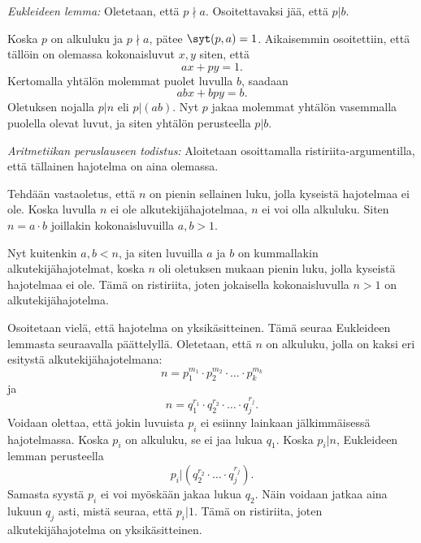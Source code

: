 \begin{todistus}
{\it Eukleideen lemma:} Oletetaan, että $p\nmid a$. Osoitettavaksi jää, että $p|b$.

Koska $p$ on alkuluku ja $p \nmid a$, pätee $\syt(p,a)=1$. Aikaisemmin osoitettiin, että tällöin on olemassa kokonaisluvut $x,y$ siten, että
\[
ax+py = 1.
\]
Kertomalla yhtälön molemmat puolet luvulla $b$, saadaan
\[
abx+bpy = b.
\]
Oletuksen nojalla $p|n$ eli $p|(ab)$. Nyt $p$ jakaa molemmat yhtälön vasemmalla puolella olevat luvut, ja siten yhtälön perusteella $p|b$. 

{\it Aritmetiikan peruslauseen todistus:}
Aloitetaan osoittamalla ristiriita-argumentilla, että tällainen hajotelma on aina olemassa.

Tehdään vastaoletus, että $n$ on pienin sellainen luku, jolla kyseistä hajotelmaa ei ole. Koska luvulla $n$ ei ole alkutekijähajotelmaa, $n$ ei voi olla alkuluku. Siten $n=a\cdot b$ joillakin kokonaisluvuilla $a,b> 1$.

Nyt kuitenkin $a,b<n$, ja siten luvuilla $a$ ja $b$ on kummallakin alkutekijähajotelmat, koska $n$ oli oletuksen mukaan pienin luku, jolla kyseistä hajotelmaa ei ole. Tämä on ristiriita, joten jokaisella kokonaisluvulla $n>1$ on alkutekijähajotelma.

Osoitetaan vielä, että hajotelma on yksikäsitteinen. Tämä seuraa Eukleideen lemmasta seuraavalla päättelyllä. Oletetaan, että $n$ on alkuluku, jolla on kaksi eri esitystä alkutekijähajotelmana:
\[
n= p_1^{m_1} \cdot p_2^{m_2} \cdot \ldots \cdot p_k^{m_k}
\]
ja
\[
n= q_1^{r_1} \cdot q_2^{r_2} \cdot \ldots \cdot q_j^{r_j}.
\]
Voidaan olettaa, että jokin luvuista $p_i$ ei esiinny lainkaan jälkimmäisessä hajotelmassa. Koska $p_i$ on alkuluku, se ei jaa lukua $q_1$. Koska $p_i|n$, Eukleideen lemman perusteella
\[
p_i | (q_2^{r_2} \cdot \ldots \cdot q_j^{r_j}).
\]
Samasta syystä $p_i$ ei voi myöskään jakaa lukua $q_2$. Näin voidaan jatkaa aina lukuun $q_j$ asti, mistä seuraa, että $p_i|1$. Tämä on ristiriita, joten alkutekijähajotelma on yksikäsitteinen.
\end{todistus}

